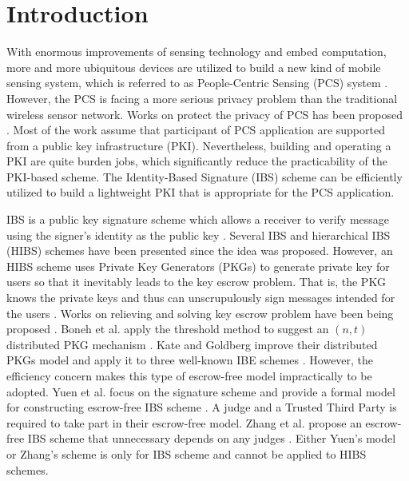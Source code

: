 \documentclass[times]{secauth}
\theoremstyle{definition}
\theoremstyle{remark}
\begin{document}
\section{Introduction} 
With enormous improvements of sensing technology and embed computation, more and more ubiquitous devices are utilized to build a new kind of mobile sensing system, which is referred to as People-Centric Sensing (PCS) system \cite{campbell2008rise}. 
However, the PCS is facing a more serious privacy problem than the traditional wireless sensor network.
Works on protect the privacy of PCS has been proposed \cite{cornelius2008anonysense,shi2010prisense,puttaswamy2010preserving,johnson2007people}. 
Most of the work assume that participant of PCS application are supported from a public key infrastructure (PKI).
Nevertheless, building and operating a PKI are quite burden jobs, which significantly reduce the practicability of the PKI-based scheme.
The Identity-Based Signature (IBS) scheme can be efficiently utilized to build a lightweight PKI that is appropriate for the PCS application.
\par 

IBS is a public key signature scheme which allows a receiver to verify message using the signer's identity as the public key \cite{shamir1985identity}. 
Several IBS and hierarchical IBS (HIBS) schemes \cite{choon2002identity,chow2004secure,gerbush2012dual} have been presented since the idea was proposed. 
However, an HIBS scheme uses Private Key Generators (PKGs) to generate private key for users so that it inevitably leads to the key escrow problem. 
That is, the PKG knows the private keys and thus can unscrupulously sign messages intended for the users \cite{boneh2001identity}. 
Works on relieving and solving key escrow problem have been being proposed \cite{boneh2001identity,kate2010distributed,cao2011sa,zhang2012efficient,yuen2010construct,chen2015efhibs}.
Boneh et al. apply the threshold method to suggest an $(n,t)$ distributed PKG mechanism \cite{boneh2001identity}. 
Kate and Goldberg improve their distributed PKGs model and apply it to three well-known IBE schemes
\cite{kate2010distributed}. 
However, the efficiency concern makes this type of escrow-free model impractically to be adopted.
Yuen et al. focus on the signature scheme and provide a formal model for constructing escrow-free IBS scheme \cite{yuen2010construct}. 
A judge and a Trusted Third Party is required to take part in their escrow-free model.
Zhang et al. propose an escrow-free IBS scheme that unnecessary depends on any judges \cite{zhang2012efficient}. 
Either Yuen's model or Zhang's scheme is only for IBS scheme and cannot be applied to HIBS schemes. 
\par
\end{document}
